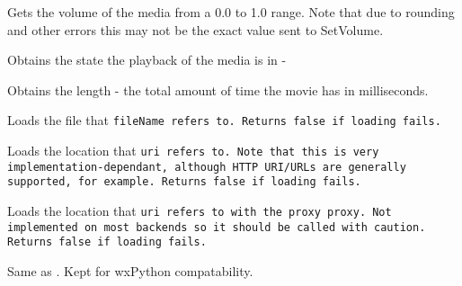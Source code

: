 Gets the volume of the media from a 0.0 to 1.0 range. Note that due to rounding
and other errors this may not be the exact value sent to SetVolume.


\label{wxmediactrlgetstate}


Obtains the state the playback of the media is in -

\twocolwidtha{7cm}
\begin{twocollist}\itemsep=0pt
\end{twocollist}


\label{wxmediactrllength}


Obtains the length - the total amount of time the movie has in milliseconds.


\label{wxmediactrlload}


Loads the file that \tt{fileName} refers to.  Returns false if loading fails.


\label{wxmediactrlloaduri}


Loads the location that \tt{uri} refers to.  Note that this is very implementation-dependant, although HTTP URI/URLs are generally supported, for example. Returns false if loading fails.


\label{wxmediactrlloaduriwithproxy}


Loads the location that \tt{uri} refers to with the proxy \tt{proxy}. Not implemented on most backends so it should be called with caution. Returns false if loading fails.


\label{wxmediactrlloaduriliteral}


Same as . Kept for wxPython compatability.


